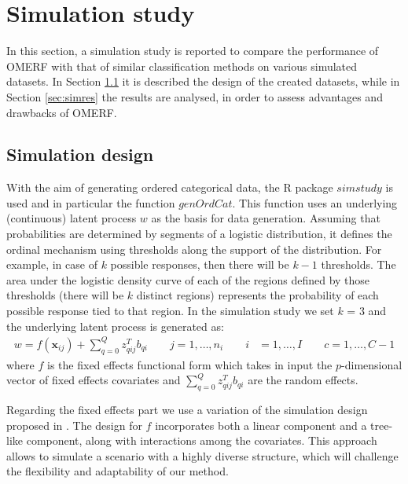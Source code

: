 \section{Simulation study}
\label{sec:sim}
In this section, a simulation study is reported to compare the performance of OMERF with that of similar classification methods on various simulated datasets.
In Section \ref{sec:simdesign} it is described the design of the created datasets, while in Section \ref{sec:simres} the results are analysed, in order to assess advantages and drawbacks of OMERF.

\subsection{Simulation design}
\label{sec:simdesign}
With the aim of generating ordered categorical data, the R package \(simstudy\) \cite{simstudy} is used and in particular the function \(genOrdCat\).
This function uses an underlying (continuous) latent process \(w\) as the basis for data generation.
Assuming that probabilities are determined by segments of a logistic distribution, it defines the ordinal mechanism
using thresholds along the support of the distribution. For example, in case of \(k\) possible responses, then there will be \(k-1\) thresholds.
The area under the logistic density curve of each of the regions defined by those thresholds (there will be \(k\)
distinct regions) represents the probability of each possible response tied to that region.
In the simulation study we set \(k\) = 3 and the underlying latent process is generated as:
\begin{equation}
    \label{eq:simstudy1}
    \begin{aligned}
        w=f(\bm{x}_{ij}) + \sum_{q=0}^{Q} z_{qij}^T b_{qi} \qquad j=1,\dots,n_{i} \qquad i&=1,\dots,I \qquad c=1,\dots,C-1
    \end{aligned}
\end{equation}
where \(f\) is the fixed effects functional form which takes in input the \(p\)-dimensional vector of fixed effects covariates and \(\sum_{q=0}^{Q} z_{qij}^T b_{qi}\) are the random effects.

Regarding the fixed effects part we use a variation of the simulation design proposed in \cite{pellagatti2021generalized}.
The design for \(f\) incorporates both a linear component and a tree-like component, along with interactions among the covariates.
This approach allows to simulate a scenario with a highly diverse structure, which will challenge the flexibility and adaptability of our method.

